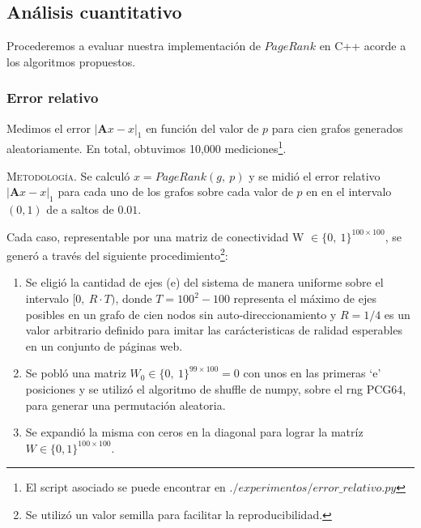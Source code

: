 \vspace{1em}

\subsection{Análisis cuantitativo}\label{cuantitativo} Procederemos a evaluar nuestra implementación de $PageRank$ en C++ acorde a los algoritmos propuestos.

\vspace{2em}
\subsubsection{Error relativo} Medimos el error $|\mathbf{A}x - x|_1$ en función del valor de $p$ para cien grafos generados aleatoriamente. En total, obtuvimos 10,000 mediciones\footnote{El script asociado se puede encontrar en $./experimentos/error\_relativo.py$}.  
\vspace{1em}

\noindent \textsc{Metodología}. Se calculó  $x = PageRank(g,\ p)$ y se midió el error relativo $|\mathbf{A}x - x|_1$ para cada uno de los grafos sobre cada valor de $p$ en en el intervalo $(0, 1)$ de a saltos de $0.01$.
\vspace{1em}

\noindent Cada caso, representable por una matriz de conectividad W $\in \{0,\ 1\}^{100 \times 100}$, se generó a través del siguiente procedimiento\footnote{Se utilizó un valor semilla para facilitar la reproducibilidad.}:
\vspace{1em}

\begin{enumerate}
    \item Se eligió  la cantidad de ejes (e) del sistema de manera uniforme sobre el intervalo $[0,\ R \cdot T)$, donde $T = 100^2 - 100$ representa el máximo de ejes posibles en un grafo de cien nodos sin auto-direccionamiento y $R = 1/4$ es un valor arbitrario definido para imitar las carácteristicas de ralidad esperables en un conjunto de páginas web.
    \item Se pobló una matriz $W_0 \in \{0,\ 1\}^{99 \times 100} = 0$ con unos en las primeras `e' posiciones y se utilizó el algoritmo de shuffle de numpy, sobre el rng \textsc{PCG64}, para generar una permutación aleatoria.
    \item Se expandió la misma con ceros en la diagonal para lograr la matríz $W \in \{0, 1\}^{100 \times 100}$. 
\end{enumerate}
\vspace{1em}


